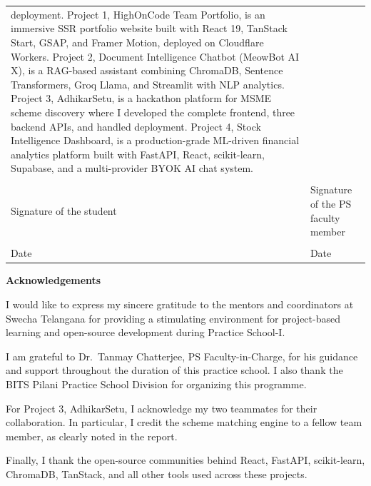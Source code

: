 \documentclass{book}
\begin{document}
{\begin{tabular}{p{5.5cm}p{7.5cm}}
    deployment. Project 1, HighOnCode Team Portfolio, is an immersive SSR portfolio
    website built with React 19, TanStack Start, GSAP, and Framer Motion, deployed on
    Cloudflare Workers. Project 2, Document Intelligence Chatbot (MeowBot AI X), is a
    RAG-based assistant combining ChromaDB, Sentence Transformers, Groq Llama, and
    Streamlit with NLP analytics. Project 3, AdhikarSetu, is a hackathon platform for
    MSME scheme discovery where I developed the complete frontend, three backend APIs,
    and handled deployment. Project 4, Stock Intelligence Dashboard, is a
    production-grade ML-driven financial analytics platform built with FastAPI, React,
    scikit-learn, Supabase, and a multi-provider BYOK AI chat system. \\
  & \\
  Signature of the student & \hspace*{1cm} Signature of the PS faculty member \\
  & \\
  Date & \hspace*{1cm} Date \\
\end{tabular}}

\newpage

\centerline{\bf \Large Acknowledgements}
\vspace*{0.5cm}

\par\noindent I would like to express my sincere gratitude to the mentors and coordinators at Swecha Telangana for providing a stimulating environment for project-based learning and open-source development during Practice School-I.

\par\noindent I am grateful to Dr.\ Tanmay Chatterjee, PS Faculty-in-Charge, for his guidance and support throughout the duration of this practice school. I also thank the BITS Pilani Practice School Division for organizing this programme.

\par\noindent For Project 3, AdhikarSetu, I acknowledge my two teammates for their collaboration. In particular, I credit the scheme matching engine to a fellow team member, as clearly noted in the report.

\par\noindent Finally, I thank the open-source communities behind React, FastAPI, scikit-learn, ChromaDB, TanStack, and all other tools used across these projects.
\end{document}
